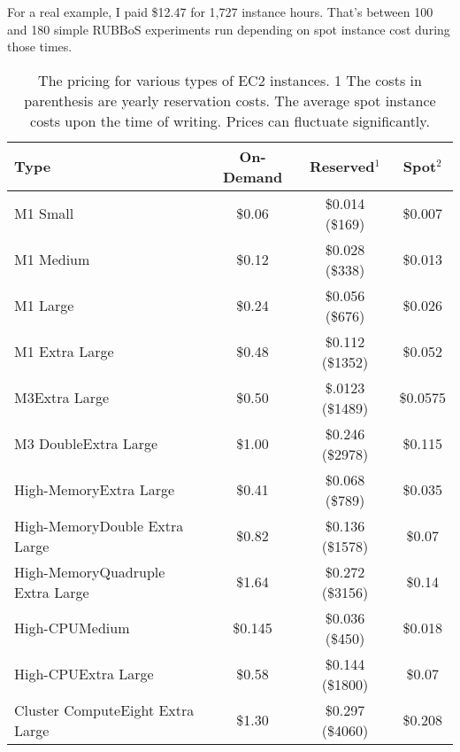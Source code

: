 \documentclass{article}
\begin{document}
For a real example, I paid \$12.47 for 1,727 instance hours. That's between 100 and 180 simple RUBBoS experiments run depending on spot instance cost during those times.

\begin{table}[bt]
\begin{tabular}{|>{\raggedright}p{4cm}|c|c|c|}
\hline
Type & On-Demand & Reserved$^1$ & Spot$^2$\\\hline
M1 Small & \$0.06 & \$0.014 (\$169) & \$0.007\\\hline
M1 Medium & \$0.12 & \$0.028 (\$338) & \$0.013\\\hline
M1 Large & \$0.24 & \$0.056 (\$676) & \$0.026\\\hline
M1 Extra Large & \$0.48 & \$0.112 (\$1352) &\$0.052\\\hline
M3\linebreak Extra Large & \$0.50 & \$.0123 (\$1489) & \$0.0575\\\hline
M3 Double\linebreak Extra Large & \$1.00 & \$0.246 (\$2978) & \$0.115\\\hline
High-Memory\linebreak Extra Large & \$0.41 & \$0.068 (\$789) & \$0.035\\\hline
High-Memory\linebreak Double Extra Large & \$0.82 & \$0.136 (\$1578) & \$0.07\\\hline
High-Memory\linebreak Quadruple Extra Large & \$1.64 & \$0.272 (\$3156) &\$0.14\\\hline
High-CPU\linebreak Medium & \$0.145 & \$0.036 (\$450) & \$0.018\\\hline
High-CPU\linebreak Extra Large & \$0.58 & \$0.144 (\$1800) & \$0.07\\\hline
Cluster Compute\linebreak Eight Extra Large & \$1.30 & \$0.297 (\$4060) & \$0.208\\\hline
\end{tabular}
\caption{The pricing for various types of EC2 instances.\cite{awsEC2pricing} \newline\newline
\footnotesize 1 The costs in parenthesis are yearly reservation costs. The average spot instance costs upon the time of writing. Prices can fluctuate significantly.}
\label{ec2instancepricing}
\end{table}
\end{document}
